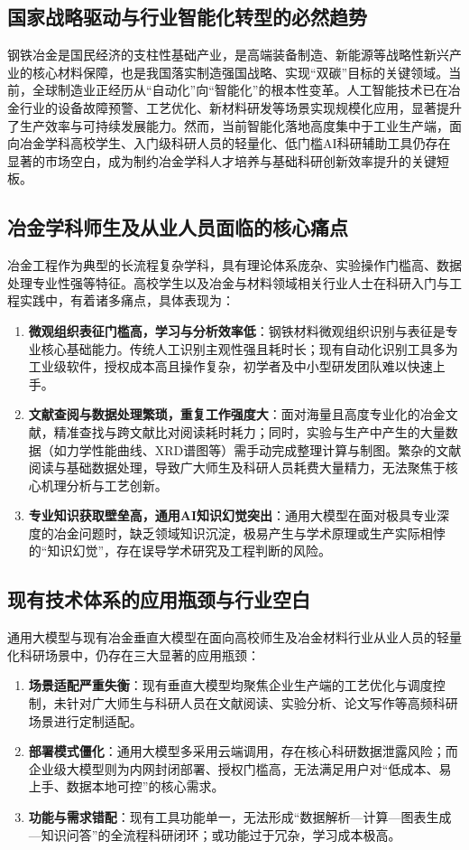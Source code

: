 \documentclass[a4paper, 12pt]{ctexart}
\begin{document}
\subsection{国家战略驱动与行业智能化转型的必然趋势}
钢铁冶金是国民经济的支柱性基础产业，是高端装备制造、新能源等战略性新兴产业的核心材料保障，也是我国落实制造强国战略、实现“双碳”目标的关键领域。当前，全球制造业正经历从“自动化”向“智能化”的根本性变革。人工智能技术已在冶金行业的设备故障预警、工艺优化、新材料研发等场景实现规模化应用，显著提升了生产效率与可持续发展能力。然而，当前智能化落地高度集中于工业生产端，面向冶金学科高校学生、入门级科研人员的轻量化、低门槛AI科研辅助工具仍存在显著的市场空白，成为制约冶金学科人才培养与基础科研创新效率提升的关键短板。

\subsection{冶金学科师生及从业人员面临的核心痛点}
冶金工程作为典型的长流程复杂学科，具有理论体系庞杂、实验操作门槛高、数据处理专业性强等特征。高校学生以及冶金与材料领域相关行业人士在科研入门与工程实践中，有着诸多痛点，具体表现为：
\begin{enumerate}
    \item \textbf{微观组织表征门槛高，学习与分析效率低}：钢铁材料微观组织识别与表征是专业核心基础能力。传统人工识别主观性强且耗时长；现有自动化识别工具多为工业级软件，授权成本高且操作复杂，初学者及中小型研发团队难以快速上手。
    \item \textbf{文献查阅与数据处理繁琐，重复工作强度大}：面对海量且高度专业化的冶金文献，精准查找与跨文献比对阅读耗时耗力；同时，实验与生产中产生的大量数据（如力学性能曲线、XRD谱图等）需手动完成整理计算与制图。繁杂的文献阅读与基础数据处理，导致广大师生及科研人员耗费大量精力，无法聚焦于核心机理分析与工艺创新。
    \item \textbf{专业知识获取壁垒高，通用AI知识幻觉突出}：通用大模型在面对极具专业深度的冶金问题时，缺乏领域知识沉淀，极易产生与学术原理或生产实际相悖的“知识幻觉”，存在误导学术研究及工程判断的风险。
\end{enumerate}

\subsection{现有技术体系的应用瓶颈与行业空白}
通用大模型与现有冶金垂直大模型在面向高校师生及冶金材料行业从业人员的轻量化科研场景中，仍存在三大显著的应用瓶颈：
\begin{enumerate}
    \item \textbf{场景适配严重失衡}：现有垂直大模型均聚焦企业生产端的工艺优化与调度控制，未针对广大师生与科研人员在文献阅读、实验分析、论文写作等高频科研场景进行定制适配。
    \item \textbf{部署模式僵化}：通用大模型多采用云端调用，存在核心科研数据泄露风险；而企业级大模型则为内网封闭部署、授权门槛高，无法满足用户对“低成本、易上手、数据本地可控”的核心需求。
    \item \textbf{功能与需求错配}：现有工具功能单一，无法形成“数据解析—计算—图表生成—知识问答”的全流程科研闭环；或功能过于冗杂，学习成本极高。
\end{enumerate}
\end{document}
